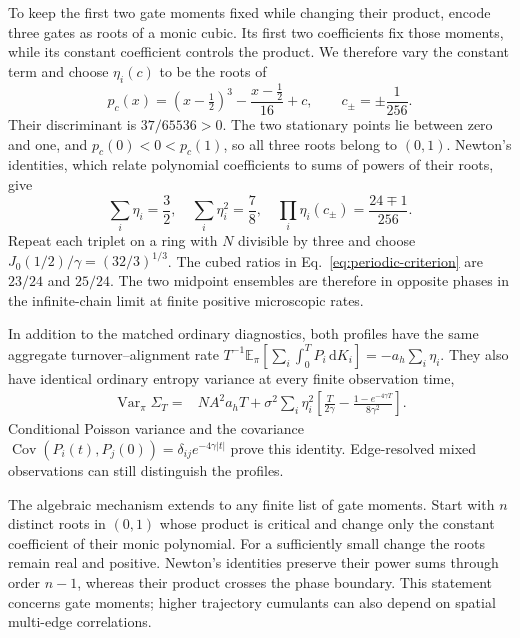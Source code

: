\documentclass[aps,pre,reprint,amsmath,amssymb,longbibliography,floatfix]{revtex4-2}
\newcommand{\E}{\mathbb E}
\newcommand{\dd}{\,\mathrm d}
\newcommand{\Var}{\operatorname{Var}}
\newcommand{\Cov}{\operatorname{Cov}}
\begin{document}
To keep the first two gate moments fixed while changing their product,
encode three gates as roots of a monic cubic. Its first two coefficients
fix those moments, while its constant coefficient controls the product.
We therefore vary the constant term and choose $\eta_i(c)$ to be the roots of 
\begin{equation}
 p_c(x)=(x-\tfrac12)^3-\frac{x-\tfrac12}{16}+c,
 \qquad c_\pm=\pm\frac1{256}.
 \label{eq:periodic-cubic}
\end{equation}
Their discriminant is $37/65536>0$. The two stationary points lie
between zero and one, and $p_c(0)<0<p_c(1)$, so all three roots belong
to $(0,1)$. Newton's identities, which relate polynomial coefficients
to sums of powers of their roots, give
\begin{equation}
 \sum_i\eta_i=\frac32,\quad
 \sum_i\eta_i^2=\frac78,\quad
 \prod_i\eta_i(c_\pm)=\frac{24\mp1}{256}.
 \label{eq:periodic-moments}
\end{equation}
Repeat each triplet on a ring with $N$ divisible by three and choose
$J_0(1/2)/\gamma=(32/3)^{1/3}$.
The cubed ratios in Eq.~\eqref{eq:periodic-criterion} are $23/24$
and $25/24$. The two midpoint ensembles are therefore in opposite
phases in the infinite-chain limit at finite positive microscopic rates.

In addition to the matched ordinary diagnostics, both profiles have the
same aggregate turnover--alignment rate
$T^{-1}\E_\pi\left[\sum_i\int_0^T P_i\dd K_i\right]=-a_h\sum_i\eta_i$. They also have identical ordinary entropy variance
at every finite observation time,
\begin{align}
 \Var_\pi\Sigma_T={}&NA^2a_hT
 +\sigma^2\sum_i\eta_i^2
 \left[\frac{T}{2\gamma}
 -\frac{1-e^{-4\gamma T}}{8\gamma^2}\right].
 \label{eq:periodic-finite-variance}
\end{align}
Conditional Poisson variance and the covariance
$\Cov(P_i(t),P_j(0))=\delta_{ij}e^{-4\gamma|t|}$ prove this identity.
Edge-resolved mixed observations can still distinguish the profiles.

The algebraic mechanism extends to any finite list of gate moments.
Start with $n$ distinct roots in $(0,1)$ whose product is critical and
change only the constant coefficient of their monic polynomial.
For a sufficiently small change the roots remain real and positive.
Newton's identities preserve their power sums through order $n-1$,
whereas their product crosses the phase boundary. This statement concerns
gate moments; higher trajectory cumulants can also depend on spatial
multi-edge correlations.
\end{document}
